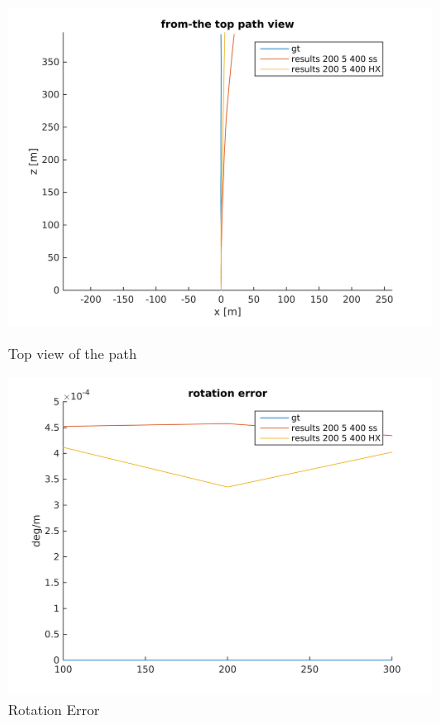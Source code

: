 \documentclass[runningheads]{llncs}
\begin{document}
\begin{figure}
  \centering

  \begin{minipage}[b]{0.45\linewidth}
    \includegraphics[scale=.4]{top_path}
    \caption{Top view of the path}
    \label{fig:4top}
  \end{minipage}
  \quad
  \begin{minipage}[b]{0.45\linewidth}
    \includegraphics[scale=.4]{rotation_error}
    \caption{Rotation Error}
    \label{fig:4rot_erro}
  \end{minipage}
  \quad
  \begin{minipage}[b]{0.45\linewidth}

\end{minipage}
\end{figure}
\end{document}
